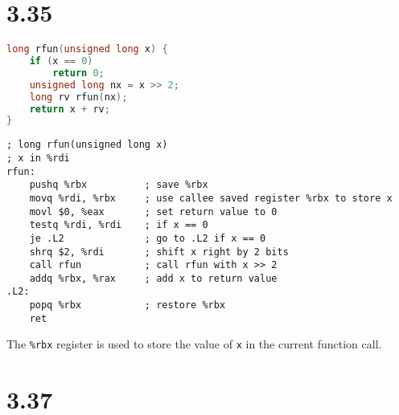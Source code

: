 \documentclass{article}
\begin{document}
\newpage
\section*{3.35}

\begin{lstlisting}[language=C]
long rfun(unsigned long x) {
    if (x == 0)
        return 0;
    unsigned long nx = x >> 2;
    long rv rfun(nx);
    return x + rv;
}
\end{lstlisting}

\begin{lstlisting}[language=myassembly]
; long rfun(unsigned long x)
; x in %rdi
rfun:
    pushq %rbx          ; save %rbx
    movq %rdi, %rbx     ; use callee saved register %rbx to store x
    movl $0, %eax       ; set return value to 0
    testq %rdi, %rdi    ; if x == 0
    je .L2              ; go to .L2 if x == 0
    shrq $2, %rdi       ; shift x right by 2 bits
    call rfun           ; call rfun with x >> 2
    addq %rbx, %rax     ; add x to return value
.L2:
    popq %rbx           ; restore %rbx
    ret
\end{lstlisting}

\noindent The \texttt{\%rbx} register is used to store the value of \texttt{x} in the current function call.

\section*{3.37}

\begin{table}[H]
\centering
{}
\end{table}
\end{document}
